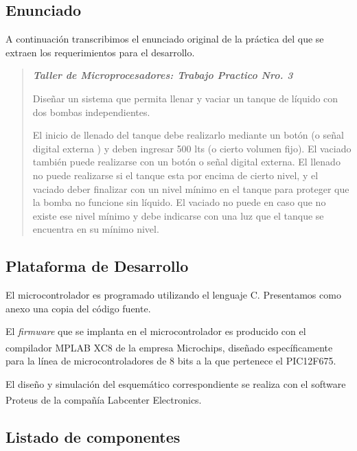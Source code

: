 \documentclass[a4paper]{article}
\let\originalcite\cite
\renewcommand{\cite}[2][]{\textsuperscript{\originalcite{#2}}}
\begin{document}
\subsection{Enunciado}

A continuación transcribimos el enunciado original de la práctica del
que se extraen los requerimientos para el desarrollo.

\begin{quotation}

    \begin{center}
        \textit{\textbf{Taller de Microprocesadores: Trabajo 
        Practico Nro. 3}}
    \end{center}

    Diseñar un sistema que permita llenar y vaciar un tanque de líquido 
    con dos bombas independientes. 

    El inicio de llenado del tanque debe realizarlo mediante un botón 
    (o señal digital externa ) y deben ingresar 500 lts (o cierto volumen 
    fijo). El vaciado también puede realizarse con un botón o señal 
    digital externa. El llenado no puede realizarse si el tanque esta por 
    encima de cierto nivel, y el vaciado deber finalizar con un nivel 
    mínimo en el tanque para proteger que la bomba no funcione sin 
    líquido. El vaciado no puede en caso que no existe ese nivel mínimo y 
    debe indicarse con una luz que el tanque se encuentra en su mínimo 
    nivel.

\end{quotation}

\subsection{Plataforma de Desarrollo}

El microcontrolador es programado utilizando el lenguaje C. 
Presentamos como anexo una copia del código fuente.

El \textit{firmware} que se implanta en el microcontrolador es  
producido con el compilador MPLAB XC8\cite{bib:compilador} de la 
empresa Microchips, diseñado específicamente para la línea de 
microcontroladores de 8 bits a la que pertenece el PIC12F675.

El diseño y simulación del esquemático correspondiente se realiza 
con el software Proteus\cite{bib:simulador} de la compañía 
Labcenter Electronics.

\subsection{Listado de componentes}
\end{document}
